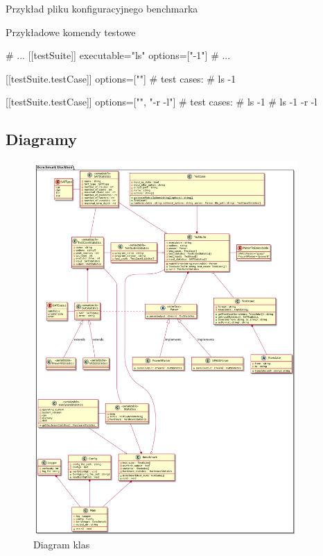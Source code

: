 \documentclass[a4paper,12pt]{article}
\newenvironment{longlisting}{\captionsetup{type=listing}}{}
\begin{document}
\begin{longlisting}
  \caption{Przykład pliku konfiguracyjnego benchmarka}
  \label{configFile}
\end{longlisting}


\begin{longlisting}
  \caption{Przykładowe komendy testowe}
  \begin{tomlcode}
# ...
[[testSuite]]
executable="ls"
options=["-1"]
# ...

[[testSuite.testCase]]
options=[""]
# test cases:
# ls -1

[[testSuite.testCase]]
options=["", "-r -l"]
# test cases:
# ls -1
# ls -1 -r -l
  \end{tomlcode}
\end{longlisting}

\subsection{Diagramy}

\begin{figure}[H]
  \centering
  \includegraphics[width=0.9\textwidth]{benchmark/class_diagram.png}
  \caption{Diagram klas}
\end{figure}
\end{document}
